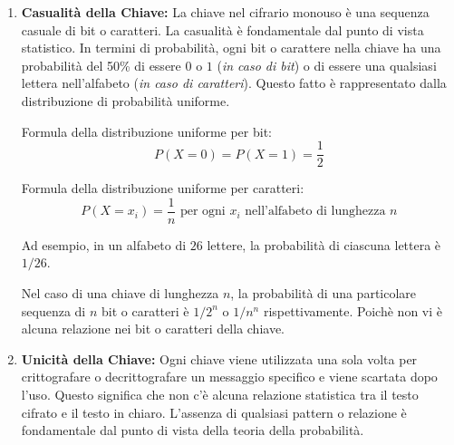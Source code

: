 \begin{enumerate}
    \item \textbf{Casualità della Chiave:} La chiave nel cifrario monouso è una sequenza casuale di bit o caratteri.
    La casualità è fondamentale dal punto di vista statistico. In termini di probabilità, ogni bit o carattere nella
    chiave ha una probabilità del 50\% di essere $0$ o $1$ (\textit{in caso di bit}) o di essere una qualsiasi
    lettera nell'alfabeto (\textit{in caso di caratteri}). Questo fatto è rappresentato dalla distribuzione di
    probabilità uniforme.
   
    Formula della distribuzione uniforme per bit:
    \[ P(X = 0) = P(X = 1) = \frac{1}{2} \]

    Formula della distribuzione uniforme per caratteri:
    \[ P(X = x_i) = \frac{1}{n} \text{ per ogni } x_i \text{ nell'alfabeto di lunghezza } n \]

    Ad esempio, in un alfabeto di $26$ lettere, la probabilità di ciascuna lettera è $1/26$.

    Nel caso di una chiave di lunghezza $n$, la probabilità di una particolare sequenza di $n$ bit o caratteri
    è $1/2^n$ o $1/n^n$ rispettivamente. Poichè non vi è alcuna relazione nei bit o caratteri della chiave.

    \item \textbf{Unicità della Chiave:} Ogni chiave viene utilizzata una sola volta per crittografare
    o decrittografare un messaggio specifico e viene scartata dopo l'uso. Questo significa che non c'è alcuna
    relazione statistica tra il testo cifrato e il testo in chiaro. L'assenza di qualsiasi pattern o relazione
    è fondamentale dal punto di vista della teoria della probabilità.
\end{enumerate}